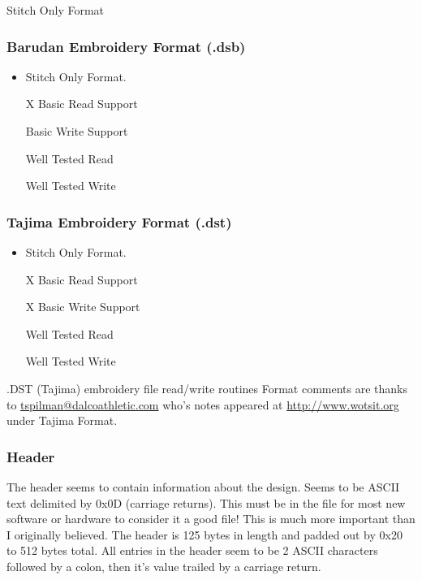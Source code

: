 \documentclass[a4paper, 11pt]{report}
\begin{document}
Stitch Only Format

\subsubsection{Barudan Embroidery Format (.dsb)}

\begin{itemize}
\item Stitch Only Format.
\item [X] Basic Read Support
\item [ ] Basic Write Support
\item [ ] Well Tested Read
\item [ ] Well Tested Write
\end{itemize}

\subsubsection{Tajima Embroidery Format (.dst)}

\begin{itemize}
\item Stitch Only Format.
\item [X] Basic Read Support
\item [X] Basic Write Support
\item [ ] Well Tested Read
\item [ ] Well Tested Write
\end{itemize}

.DST (Tajima) embroidery file read/write routines
Format comments are thanks to \url{tspilman@dalcoathletic.com} who's
notes appeared at \url{http://www.wotsit.org} under Tajima Format.

\subsubsection{Header}

The header seems to contain information about the design.
Seems to be ASCII text delimited by 0x0D (carriage returns).
This must be in the file for most new software or hardware
to consider it a good file! This is much more important
than I originally believed. The header is 125 bytes in
length and padded out by 0x20 to 512 bytes total.
All entries in the header seem to be 2 ASCII characters
followed by a colon, then it's value trailed by a carriage return.
\end{document}
